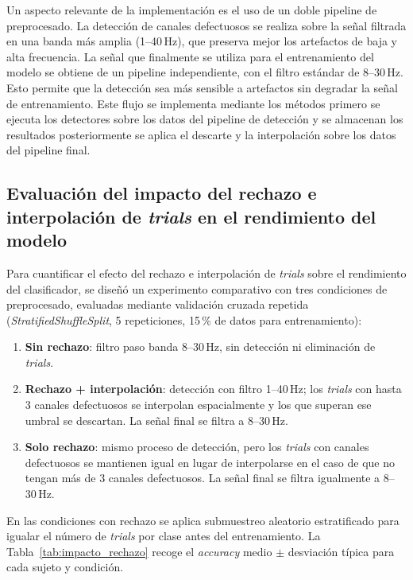 Un aspecto relevante de la implementación es el uso de un doble pipeline de preprocesado. La detección de canales defectuosos se realiza sobre la señal filtrada en una banda más amplia (1--40\,Hz), que preserva mejor los artefactos de baja y alta frecuencia. La señal que finalmente se utiliza para el entrenamiento del modelo se obtiene de un pipeline independiente, con el filtro estándar de 8--30\,Hz. Esto permite que la detección sea más sensible a artefactos sin degradar la señal de entrenamiento. Este flujo se implementa mediante los métodos primero se ejecuta los detectores sobre los datos del pipeline de detección y se almacenan los resultados posteriormente se aplica el descarte y la interpolación sobre los datos del pipeline final.

\subsection{Evaluación del impacto del rechazo e interpolación de \textit{trials} en el rendimiento del modelo}
\label{subsec:evaluacion_impacto_epochs}

Para cuantificar el efecto del rechazo e interpolación de \textit{trials} sobre el rendimiento del clasificador, se diseñó un experimento comparativo con tres condiciones de preprocesado, evaluadas mediante validación cruzada repetida (\textit{StratifiedShuffleSplit}, 5 repeticiones, 15\,\% de datos para entrenamiento):

\begin{enumerate}
    \item \textbf{Sin rechazo}: filtro paso banda 8--30\,Hz, sin detección ni eliminación de \textit{trials}.
    \item \textbf{Rechazo + interpolación}: detección con filtro 1--40\,Hz; los \textit{trials} con hasta 3 canales defectuosos se interpolan espacialmente y los que superan ese umbral se descartan. La señal final se filtra a 8--30\,Hz.
    \item \textbf{Solo rechazo}: mismo proceso de detección, pero los \textit{trials} con canales defectuosos se mantienen igual en lugar de interpolarse en el caso de que no tengan más de 3 canales defectuosos. La señal final se filtra igualmente a 8--30\,Hz.
\end{enumerate}

En las condiciones con rechazo se aplica submuestreo aleatorio estratificado para igualar el número de \textit{trials} por clase antes del entrenamiento. La Tabla~\ref{tab:impacto_rechazo} recoge el \textit{accuracy} medio $\pm$ desviación típica para cada sujeto y condición.


